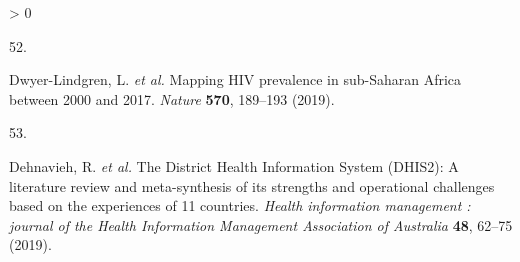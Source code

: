 \documentclass[
]{article}
\newlength{\cslhangindent}
\newlength{\csllabelwidth}
\newenvironment{CSLReferences}[2] %
 {%
  \setlength{\parindent}{0pt}
  \ifodd #1 \everypar{\setlength{\hangindent}{\cslhangindent}}\ignorespaces\fi
  \ifnum #2 > 0
  \setlength{\parskip}{#2\baselineskip}
  \fi
 }%
 {}
\newcommand{\CSLLeftMargin}[1]{\parbox[t]{\csllabelwidth}{#1}}
\newcommand{\CSLRightInline}[1]{\parbox[t]{\linewidth - \csllabelwidth}{#1}\break}
\begin{document}
\begin{CSLReferences}{0}{0}
\leavevmode\hypertarget{ref-Dwyer-Lindgren2019}{}%
\CSLLeftMargin{52. }
\CSLRightInline{Dwyer-Lindgren, L. \emph{et al.} {Mapping HIV prevalence in sub-Saharan Africa between 2000 and 2017}. \emph{Nature} \textbf{570}, 189--193 (2019).}

\leavevmode\hypertarget{ref-Dehnavieh2019}{}%
\CSLLeftMargin{53. }
\CSLRightInline{Dehnavieh, R. \emph{et al.} {The District Health Information System (DHIS2): A literature review and meta-synthesis of its strengths and operational challenges based on the experiences of 11 countries}. \emph{Health information management : journal of the Health Information Management Association of Australia} \textbf{48}, 62--75 (2019).}

\end{CSLReferences}
\end{document}
